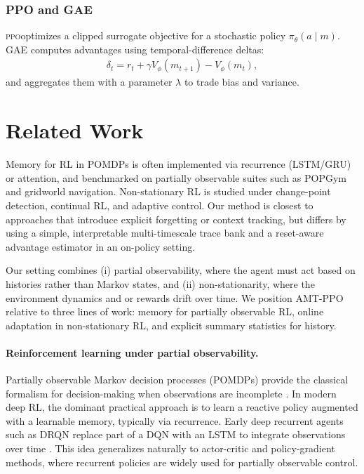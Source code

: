 \documentclass{article}
\newcommand{\PPO}{\textsc{ppo}}
\begin{document}
\subsubsection*{PPO and GAE}
\PPO optimizes a clipped surrogate objective for a stochastic policy $\pi_\theta(a\mid m)$. GAE computes advantages using temporal-difference deltas:
\begin{align}
\delta_t = r_t + \gamma V_\phi(m_{t+1}) - V_\phi(m_t),
\end{align}
and aggregates them with a parameter $\lambda$ to trade bias and variance.


\section{Related Work}

Memory for RL in POMDPs is often implemented via recurrence (LSTM/GRU) or attention, and benchmarked on partially observable suites such as POPGym and gridworld navigation. Non-stationary RL is studied under change-point detection, continual RL, and adaptive control. Our method is closest to approaches that introduce explicit forgetting or context tracking, but differs by using a simple, interpretable multi-timescale trace bank and a reset-aware advantage estimator in an on-policy setting.

Our setting combines (i) partial observability, where the agent must act based on histories rather than Markov states, and (ii) non-stationarity, where the environment dynamics and or rewards drift over time. We position AMT-PPO relative to three lines of work: memory for partially observable RL, online adaptation in non-stationary RL, and explicit summary statistics for history.

\paragraph{Reinforcement learning under partial observability.}
Partially observable Markov decision processes (POMDPs) provide the classical formalism for decision-making when observations are incomplete \citep{kaelbling1998planning}. In modern deep RL, the dominant practical approach is to learn a reactive policy augmented with a learnable memory, typically via recurrence. Early deep recurrent agents such as DRQN replace part of a DQN with an LSTM to integrate observations over time \citep{hausknecht2015drqn}. This idea generalizes naturally to actor-critic and policy-gradient methods, where recurrent policies are widely used for partially observable control.
\end{document}
